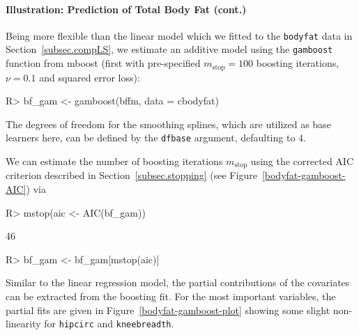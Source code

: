 \documentclass{article}
\newcommand{\Rpackage}[1]{{\normalfont\fontseries{b}\selectfont #1}}
\newcommand{\Robject}[1]{\texttt{#1}}
\newcommand{\Rcmd}[1]{\texttt{#1}}
\newenvironment{Schunk}{}{}
\begin{document}
 

\paragraph{Illustration: Prediction of Total Body Fat (cont.)}


Being more flexible than the linear model which we fitted to the
\Robject{bodyfat} data in Section~\ref{subsec.compLS}, we estimate an additive
model using the \Rcmd{gamboost} function from \Rpackage{mboost} (first with
pre-specified $m_\text{stop} = 100$ 
boosting iterations, $\nu = 0.1$ and squared error loss):
\begin{Schunk}
\begin{Sinput}
R> bf_gam <- gamboost(bffm, data = cbodyfat)
\end{Sinput}
\end{Schunk}
The degrees of freedom for the smoothing splines, which are utilized as
base learners here, 
can be defined by the \Rcmd{dfbase} argument, defaulting to $4$. 

We can estimate the number of boosting iterations $m_\text{stop}$
using the corrected AIC criterion described in
Section~\ref{subsec.stopping}
(see Figure~\ref{bodyfat-gamboost-AIC}) via
\begin{Schunk}
\begin{Sinput}
R> mstop(aic <- AIC(bf_gam))
\end{Sinput}
\begin{Soutput}
[1] 46
\end{Soutput}
\begin{Sinput}
R> bf_gam <- bf_gam[mstop(aic)]
\end{Sinput}
\end{Schunk}
Similar to the linear regression model, the partial contributions of the covariates
can be extracted from the boosting fit. For the most important variables, 
the partial fits are given in Figure~\ref{bodyfat-gamboost-plot} showing some 
slight non-linearity for \Robject{hipcirc} and \Robject{kneebreadth}.
\end{document}
